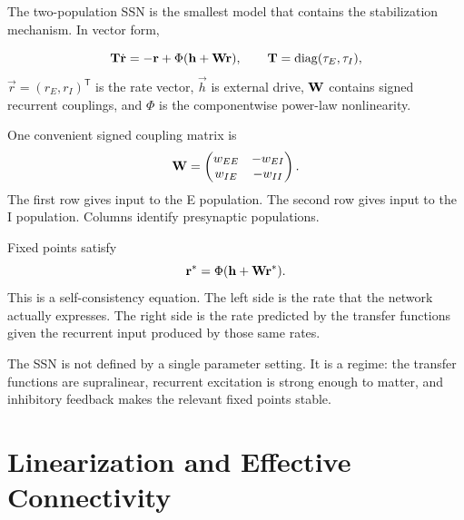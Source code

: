 The two-population SSN is the smallest model that contains the stabilization mechanism. In vector form,
%
\begin{keyequation}
\begin{equation}
  \mathbf{T}\dot{\mathbf{r}}
  =
  -\mathbf{r}
  +
  \Phi(\mathbf{h}+\mathbf{W}\mathbf{r}),
  \qquad
  \mathbf{T}=\operatorname{diag}(\tau_E,\tau_I),
  \label{eq:two-population-ssn}
\end{equation}
\tcblower
$\vec r=(r_E,r_I)^{\mathsf T}$ is the rate vector, $\vec h$ is external drive, $\mathbf{W}$ contains signed recurrent couplings, and $\Phi$ is the componentwise power-law nonlinearity.
\end{keyequation}
%
One convenient signed coupling matrix is
%
\begin{equation}
  \mathbf{W}
  =
  \begin{pmatrix}
    w_{EE} & -w_{EI}\\
    w_{IE} & -w_{II}
  \end{pmatrix}.
  \label{eq:ssn-signed-coupling}
\end{equation}
%
The first row gives input to the E population. The second row gives input to the I population. Columns identify presynaptic populations.

Fixed points satisfy
%
\begin{equation}
  \mathbf{r}^*
  =
  \Phi(\mathbf{h}+\mathbf{W}\mathbf{r}^*).
  \label{eq:ssn-fixed-point}
\end{equation}
%
This is a self-consistency equation. The left side is the rate that the network actually expresses. The right side is the rate predicted by the transfer functions given the recurrent input produced by those same rates.

The SSN is not defined by a single parameter setting. It is a regime: the transfer functions are supralinear, recurrent excitation is strong enough to matter, and inhibitory feedback makes the relevant fixed points stable.

\section{Linearization and Effective Connectivity}
\label{sec:ssn-linearization-effective-connectivity}

